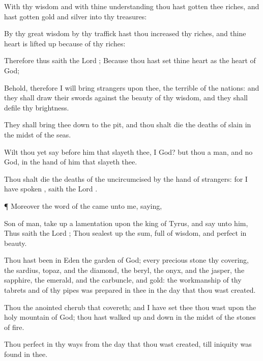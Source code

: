 {With thy
wisdom and with thine
understanding thou hast
gotten thee
riches, and hast
gotten
gold and
silver into thy
treasures:

By thy
great
wisdom
{} by thy
traffick hast thou
increased thy
riches, and thine
heart is lifted
up because of thy
riches:

Therefore thus
saith the
Lord
{}; Because thou hast
set thine
heart as the
heart of
God;

Behold, therefore I will
bring
strangers upon thee, the
terrible of the
nations: and they shall
draw their
swords against the
beauty of thy
wisdom, and they shall
defile thy
brightness.

They shall bring thee
down to the
pit, and thou shalt
die the
deaths of
{}
slain in the
midst of the
seas.

Wilt thou
yet
say
before him that
slayeth thee, I
{}
God? but thou
{} a
man, and no
God, in the
hand of him that
slayeth thee.

Thou shalt
die the
deaths of the
uncircumcised by the
hand of
strangers: for I have
spoken
{},
saith the
Lord
{}.


\par }{\PP {}¶ Moreover the
word of the
{} came unto me,
saying,

Son of
man, take
up a
lamentation upon the
king of
Tyrus, and
say unto him, Thus
saith the
Lord
{}; Thou sealest
up the
sum,
full of
wisdom, and
perfect in
beauty.

Thou hast been in
Eden the
garden of
God; every
precious
stone
{} thy
covering, the
sardius,
topaz, and the
diamond, the
beryl, the
onyx, and the
jasper, the
sapphire, the
emerald, and the
carbuncle, and
gold: the
workmanship of thy
tabrets and of thy
pipes was
prepared in thee in the
day that thou wast
created.

Thou
{} the
anointed
cherub that
covereth; and I have
set thee
{} thou wast upon the
holy
mountain of
God; thou hast walked up and
down in the
midst of the
stones of
fire.

Thou
{}
perfect in thy
ways from the
day that thou wast
created, till
iniquity was
found in thee.

}
